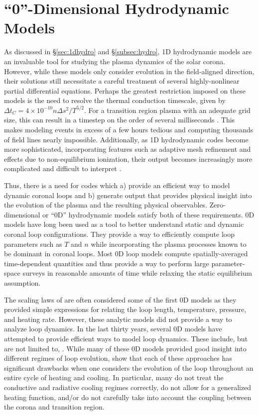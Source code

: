 \section{``0''-Dimensional Hydrodynamic Models }
\label{sec:0dmodels}
%
\par As discussed in \S\ref{sec:1dhydro} and \S\ref{subsec:hydro}, 1D hydrodynamic models are an invaluable tool for studying the plasma dynamics of the solar corona. However, while these models only consider evolution in the field-aligned direction, their solutions still necessitate a careful treatment of several highly-nonlinear partial differential equations. Perhaps the greatest restriction imposed on these models is the need to resolve the thermal conduction timescale, given by $\Delta t_C=4\times10^{-10}n\Delta s^2/T^{5/2}$. For a transition region plasma with an adequate grid size, this can result in a timestep on the order of several milliseconds \citep{bradshaw_influence_2013}. This makes modeling events in excess of a few hours tedious and computing thousands of field lines nearly impossible. Additionally, as 1D hydrodynamic codes become more sophisticated, incorporating features such as adaptive mesh refinement and effects due to non-equilibrium ionization, their output becomes increasingly more complicated and difficult to interpret \citep{cargill_enthalpy-based_2012-1}.
%
\par Thus, there is a need for codes which a) provide an efficient way to model dynamic coronal loops and b) generate output that provides physical insight into the evolution of the plasma and the resulting physical observables. Zero-dimensional or ``0D'' hydrodynamic models satisfy both of these requirements. 0D models have long been used as a tool to better understand static and dynamic coronal loop configurations. They provide a way to efficiently compute loop parameters such as $T$ and $n$ while incorporating the plasma processes known to be dominant in coronal loops. Most 0D loop models compute spatially-averaged time-dependent quantities and thus provide a way to perform large parameter-space surveys in reasonable amounts of time while relaxing the static equilibrium assumption.
%
\par The scaling laws of \citet{rosner_dynamics_1978} are often considered some of the first 0D models as they provided simple expressions for relating the loop length, temperature, pressure, and heating rate. However, these analytic models did not provide a way to analyze loop dynamics. In the last thirty years, several 0D models have attempted to provide efficient ways to model loop dynamics. These include, but are not limited to, \citet{fisher_equation_1990,kopp_coronal_1993,cargill_implications_1994,aschwanden_hydrodynamic_2009}. While many of these 0D models provided good insight into different regimes of loop evolution, \citet{cargill_enthalpy-based_2012-1} show that each of these approaches has significant drawbacks when one considers the evolution of the loop throughout an entire cycle of heating and cooling. In particular, many do not treat the conductive and radiative cooling regimes correctly, do not allow for a generalized heating function, and/or do not carefully take into account the coupling between the corona and transition region. 
